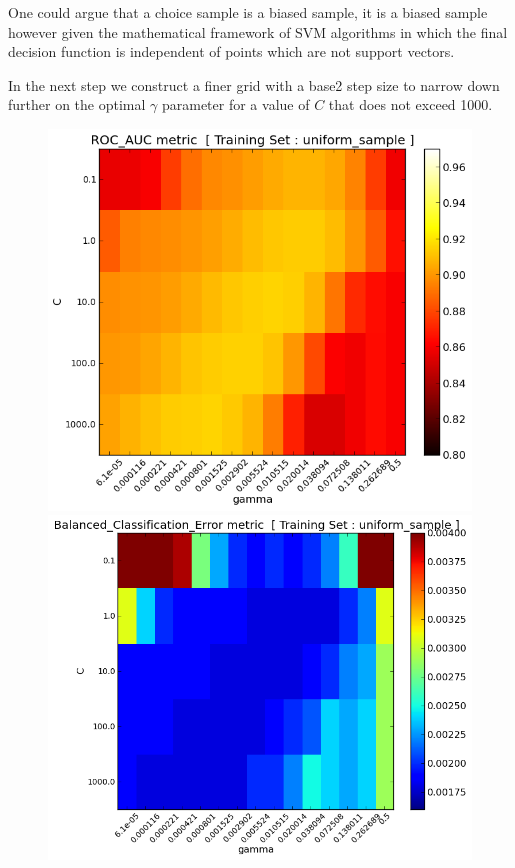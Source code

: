 \documentclass[final,3p,times,twocolumn]{elsarticle}
\begin{document}
One could argue that a choice sample is a biased sample, it is a biased sample however given the mathematical framework of SVM algorithms in which the final decision function is independent of points which are not support vectors. 

In the next step we construct a finer grid with a base2 step size to narrow down further on the optimal $\gamma$ parameter for a value of $C$ that does not exceed 1000.  

\begin{figure}
\hspace*{-0.5cm}
\includegraphics[scale=0.5]{Images/ROC_AUC_uniform_sample_grid2.png} 
\includegraphics[scale=0.5]{Images/Balanced_Classification_Error_uniform_sample_grid2.png} 

\end{figure}
\end{document}
